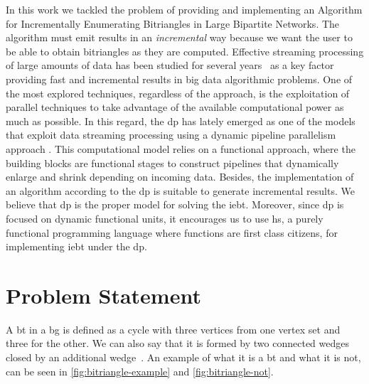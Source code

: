 In this work we tackled the problem of providing and implementing an Algorithm for Incrementally Enumerating Bitriangles in Large Bipartite Networks. The algorithm must emit  results in an \emph{incremental} way because we want the user to be able to obtain bitriangles as they are computed.   
Effective streaming processing of large amounts of data has been studied for several years~\cite{enumeratingsg, exploiting, onthefly} as a key factor providing fast and incremental results in big data algorithmic problems. 
One of the most explored techniques, regardless of the approach, is the exploitation of parallel techniques to take advantage of the available computational power as much as possible. 
In this regard, the \acrfull{dp} \cite{dpdef} has lately emerged as one of the models that exploit data streaming processing using a dynamic pipeline parallelism approach \cite{onthefly}. 
This computational model relies on a functional approach, where the building blocks are functional stages to construct pipelines that dynamically enlarge and shrink depending on incoming data.  Besides,  the implementation of an algorithm according to the \acrshort{dp} is suitable to generate incremental results. 
We believe that \acrshort{dp} is the proper model for solving the \acrshort{iebt}. Moreover, since   \acrshort{dp} is focused on dynamic functional units, it encourages us to use \acrlong{hs}, a purely functional programming language where functions are first class citizens, for implementing \acrshort{iebt} under the  \acrshort{dp}.

\section{Problem Statement}
A \acrlong{bt} in a \acrlong{bg} is defined as a cycle with three vertices from one vertex set and three for the other. We can also say that it is formed by two connected wedges closed by an additional wedge~\cite{btcount}.
An example of what it is a \acrshort{bt} and what it is not, can be seen in \autoref{fig:bitriangle-example} and \autoref{fig:bitriangle-not}.


